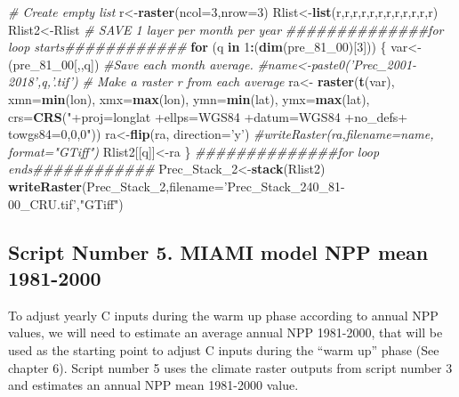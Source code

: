 \documentclass[
  10pt,
  b5paper,
]{book}
\newenvironment{Shaded}{\begin{snugshade}}{\end{snugshade}}
\newcommand{\CommentTok}[1]{\textcolor[rgb]{0.56,0.35,0.01}{\textit{#1}}}
\newcommand{\ControlFlowTok}[1]{\textcolor[rgb]{0.13,0.29,0.53}{\textbf{#1}}}
\newcommand{\DataTypeTok}[1]{\textcolor[rgb]{0.13,0.29,0.53}{#1}}
\newcommand{\DecValTok}[1]{\textcolor[rgb]{0.00,0.00,0.81}{#1}}
\newcommand{\KeywordTok}[1]{\textcolor[rgb]{0.13,0.29,0.53}{\textbf{#1}}}
\newcommand{\NormalTok}[1]{#1}
\newcommand{\OperatorTok}[1]{\textcolor[rgb]{0.81,0.36,0.00}{\textbf{#1}}}
\newcommand{\StringTok}[1]{\textcolor[rgb]{0.31,0.60,0.02}{#1}}
\begin{document}
\begin{Shaded}
\begin{Highlighting}[]
 \CommentTok{# Create empty list}
\NormalTok{r<-}\KeywordTok{raster}\NormalTok{(}\DataTypeTok{ncol=}\DecValTok{3}\NormalTok{,}\DataTypeTok{nrow=}\DecValTok{3}\NormalTok{)}
\NormalTok{Rlist<-}\KeywordTok{list}\NormalTok{(r,r,r,r,r,r,r,r,r,r,r,r)}
\NormalTok{Rlist2<-Rlist}
 \CommentTok{# SAVE 1 layer per month per year}
\CommentTok{##############for loop starts############}
 \ControlFlowTok{for}\NormalTok{ (q }\ControlFlowTok{in} \DecValTok{1}\OperatorTok{:}\NormalTok{(}\KeywordTok{dim}\NormalTok{(pre_}\DecValTok{81}\NormalTok{_}\DecValTok{00}\NormalTok{)[}\DecValTok{3}\NormalTok{])) \{}
\NormalTok{var<-(pre_}\DecValTok{81}\NormalTok{_}\DecValTok{00}\NormalTok{[,,q])}
 \CommentTok{#Save each month average. }
 \CommentTok{#name<-paste0('Prec_2001-2018',q,'.tif')}
 \CommentTok{# Make a raster r from each average}
\NormalTok{ra<-}\StringTok{ }\KeywordTok{raster}\NormalTok{(}\KeywordTok{t}\NormalTok{(var), }\DataTypeTok{xmn=}\KeywordTok{min}\NormalTok{(lon), }\DataTypeTok{xmx=}\KeywordTok{max}\NormalTok{(lon), }\DataTypeTok{ymn=}\KeywordTok{min}\NormalTok{(lat), }\DataTypeTok{ymx=}\KeywordTok{max}\NormalTok{(lat), }\DataTypeTok{crs=}\KeywordTok{CRS}\NormalTok{(}\StringTok{"+proj=longlat +ellps=WGS84 +datum=WGS84 +no_defs+ towgs84=0,0,0"}\NormalTok{))}
\NormalTok{ra<-}\KeywordTok{flip}\NormalTok{(ra, }\DataTypeTok{direction=}\StringTok{'y'}\NormalTok{)}
\CommentTok{#writeRaster(ra,filename=name, format="GTiff")}
\NormalTok{Rlist2[[q]]<-ra}
\NormalTok{\}}
\CommentTok{##############for loop ends############}
\NormalTok{Prec_Stack_}\DecValTok{2}\NormalTok{<-}\KeywordTok{stack}\NormalTok{(Rlist2)}
\KeywordTok{writeRaster}\NormalTok{(Prec_Stack_}\DecValTok{2}\NormalTok{,}\DataTypeTok{filename=}\StringTok{'Prec_Stack_240_81-00_CRU.tif'}\NormalTok{,}\StringTok{"GTiff"}\NormalTok{)}
\end{Highlighting}
\end{Shaded}

\hypertarget{script-number-5.-miami-model-npp-mean-1981-2000}{%
\subsection{Script Number 5. MIAMI model NPP mean 1981-2000}\label{script-number-5.-miami-model-npp-mean-1981-2000}}

To adjust yearly C inputs during the warm up phase according to annual NPP values, we will need to estimate an average annual NPP 1981-2000, that will be used as the starting point to adjust C inputs during the ``warm up'' phase (See chapter 6). Script number 5 uses the climate raster outputs from script number 3 and estimates an annual NPP mean 1981-2000 value.
\end{document}
